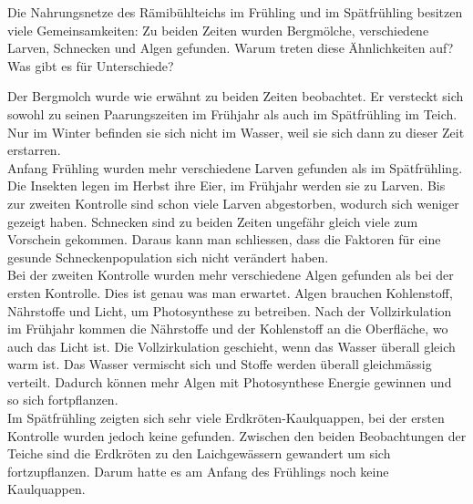 \documentclass{article}
\begin{document}
        Die Nahrungsnetze des Rämibühlteichs im Frühling und im Spätfrühling besitzen viele Gemeinsamkeiten: Zu beiden Zeiten wurden Bergmölche, verschiedene Larven, Schnecken und Algen gefunden. Warum treten diese Ähnlichkeiten auf? Was gibt es für Unterschiede? \\
        \vspace{5mm}
        
        Der Bergmolch wurde wie erwähnt zu beiden Zeiten beobachtet. Er versteckt sich sowohl zu seinen Paarungszeiten im Frühjahr als auch im Spätfrühling im Teich. Nur im Winter befinden sie sich nicht im Wasser, weil sie sich dann zu dieser Zeit erstarren.\\
        \vspace{5mm}
        Anfang Frühling wurden mehr verschiedene Larven gefunden als im Spätfrühling. Die Insekten legen im Herbst ihre Eier, im Frühjahr werden sie zu Larven. Bis zur zweiten Kontrolle sind schon viele Larven abgestorben, wodurch sich weniger gezeigt haben.
        Schnecken sind zu beiden Zeiten ungefähr gleich viele zum Vorschein gekommen. Daraus kann man schliessen, dass die Faktoren für eine gesunde Schneckenpopulation sich nicht verändert haben. \\
        \vspace{5mm}
        Bei der zweiten Kontrolle wurden mehr verschiedene Algen gefunden als bei der ersten Kontrolle. Dies ist genau was man erwartet. Algen brauchen Kohlenstoff, Nährstoffe und Licht, um Photosynthese zu betreiben. Nach der Vollzirkulation im Frühjahr kommen die Nährstoffe und der Kohlenstoff an die Oberfläche, wo auch das Licht ist. Die Vollzirkulation geschieht, wenn das Wasser überall gleich warm ist. Das Wasser vermischt sich und Stoffe werden überall gleichmässig verteilt. Dadurch können mehr Algen mit Photosynthese Energie gewinnen und so sich fortpflanzen. \\
        \vspace{5mm}
        Im Spätfrühling zeigten sich sehr viele Erdkröten-Kaulquappen, bei der ersten Kontrolle wurden jedoch keine gefunden. Zwischen den beiden Beobachtungen der Teiche sind die Erdkröten zu den Laichgewässern gewandert um sich fortzupflanzen. Darum hatte es am Anfang des Frühlings noch keine Kaulquappen. \\
        
        
    
\end{document}
